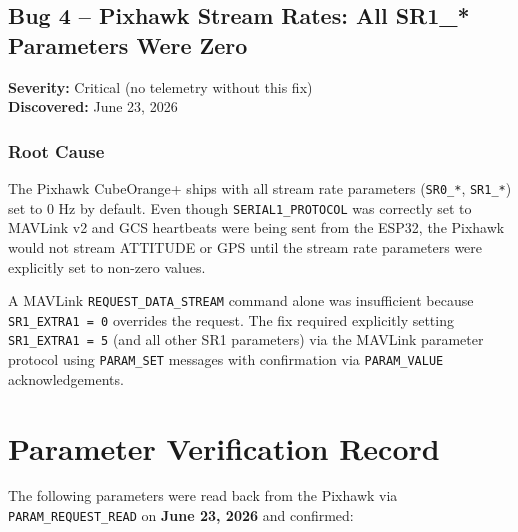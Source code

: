 \documentclass[11pt,a4paper]{article}
\begin{document}
\subsection{Bug 4 -- Pixhawk Stream Rates: All SR1\_* Parameters Were Zero}

\textbf{Severity:} Critical (no telemetry without this fix) \\
\textbf{Discovered:} June 23, 2026

\subsubsection{Root Cause}

The Pixhawk CubeOrange+ ships with all stream rate parameters
(\texttt{SR0\_*}, \texttt{SR1\_*}) set to 0 Hz by default. Even though
\texttt{SERIAL1\_PROTOCOL} was correctly set to MAVLink v2 and GCS heartbeats
were being sent from the ESP32, the Pixhawk would not stream ATTITUDE or GPS
until the stream rate parameters were explicitly set to non-zero values.

A MAVLink \texttt{REQUEST\_DATA\_STREAM} command alone was insufficient because
\texttt{SR1\_EXTRA1 = 0} overrides the request. The fix required explicitly
setting \texttt{SR1\_EXTRA1 = 5} (and all other SR1 parameters) via the
MAVLink parameter protocol using \texttt{PARAM\_SET} messages with
confirmation via \texttt{PARAM\_VALUE} acknowledgements.

\newpage

\section{Parameter Verification Record}
\label{sec:params}

The following parameters were read back from the Pixhawk via
\texttt{PARAM\_REQUEST\_READ} on \textbf{June 23, 2026} and confirmed:
\end{document}
